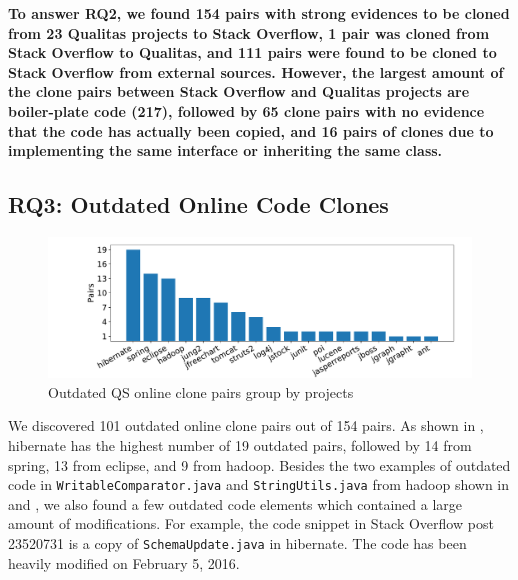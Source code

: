 \documentclass[10pt,journal,compsoc]{IEEEtran}
\begin{document}
\textbf{To answer RQ2, we found 154 pairs with
	strong evidences to be cloned from 23 Qualitas projects to Stack Overflow, 1 pair
	was cloned from Stack Overflow to Qualitas, and
	111 pairs were found to be cloned to Stack Overflow from external
	sources. However, the largest amount of the clone pairs
	between Stack Overflow and Qualitas projects are \linebreak boiler-plate code
	(217), followed by 65 clone pairs with no evidence that the code has actually been copied,
	and 16 pairs of clones due to implementing the same interface or inheriting the same class.} 


\subsection{RQ3: Outdated Online Code Clones}

\begin{figure}
	\centering
	\includegraphics[width=0.8\linewidth]{outdated}
	\caption{Outdated QS online clone pairs group by projects}
	\label{fig:outdated}
\end{figure}

We discovered 101 outdated online clone pairs out of 154 pairs. As shown in
, \textsf{hibernate} has the highest number of 19 outdated
pairs, followed by 14 from \textsf{spring}, 13 from \textsf{eclipse}, and 9 from
\textsf{hadoop}. Besides the two examples of outdated code in %
{\small{\texttt{WritableComparator.java}}} and
{\small{\texttt{StringUtils.java}}} from \textsf{hadoop} shown in
 and , we also found a few
outdated code elements which contained a large amount of modifications. For
example, the code snippet in Stack Overflow post 23520731 is a copy of
{\small{\texttt{SchemaUpdate.java}}} in \textsf{hibernate}. The code has been
heavily modified on February 5, 2016.

\end{document}

